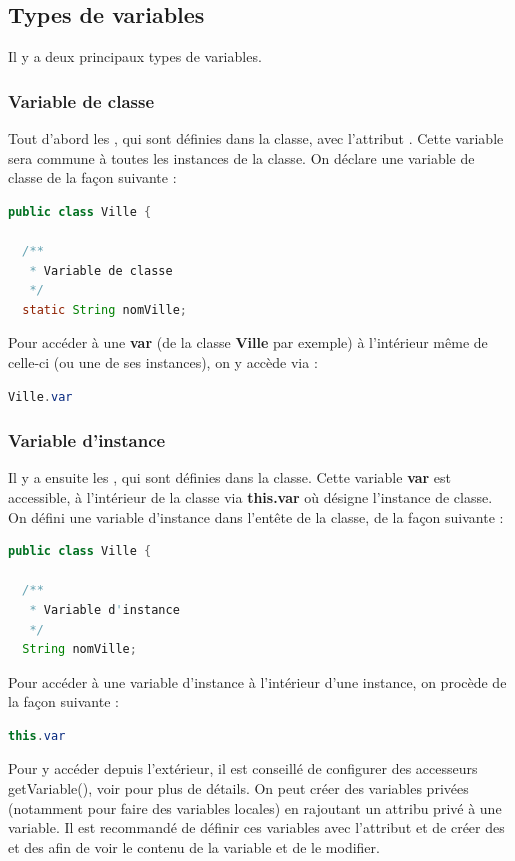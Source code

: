 \documentclass[a4paper,twoside]{article}
\begin{document}
\subsection{Types de variables}

Il y a deux principaux types de variables. 

\subsubsection{Variable de classe}
Tout d'abord les , qui sont définies dans la classe, avec l'attribut . Cette variable sera commune à toutes les instances de la classe. On déclare une variable de classe de la façon suivante :
\begin{lstlisting}[language=java]
public class Ville {
 
  /**
   * Variable de classe
   */
  static String nomVille;
\end{lstlisting}

\bigskip

Pour accéder à une  \textbf{var} (de la classe \textbf{Ville} par exemple) à l'intérieur même de celle-ci (ou une de ses instances), on y accède via :
\begin{lstlisting}[language=java]
Ville.var
\end{lstlisting}

\subsubsection{Variable d'instance}
Il y a ensuite les , qui sont définies dans la classe. Cette variable \textbf{var} est accessible, à l'intérieur de la classe via \textbf{this.var} où  désigne l'instance de classe. On défini une variable d'instance dans l'entête de la classe, de la façon suivante :
\begin{lstlisting}[language=java]
public class Ville {
 
  /**
   * Variable d'instance
   */
  String nomVille;
\end{lstlisting}

Pour accéder à une variable d'instance à l'intérieur d'une instance, on procède de la façon suivante :
\begin{lstlisting}[language=java]
this.var
\end{lstlisting}

Pour y accéder depuis l'extérieur, il est conseillé de configurer des accesseurs \og getVariable()\fg, voir  pour plus de détails. On peut créer des variables privées (notamment pour faire des variables locales) en rajoutant un attribu privé à une variable. Il est recommandé de définir ces variables avec l'attribut  et de créer des  et des  afin de voir le contenu de la variable et de le modifier.
\end{document}
